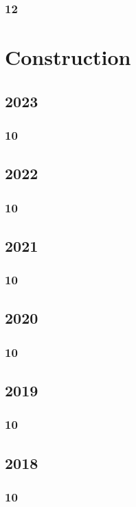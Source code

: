 \documentclass[11pt]{book}
\begin{document}
\subsection{12}





\chapter{Construction}
\section{2023}
\subsection{10}

\section{2022}
\subsection{10}

\section{2021}
\subsection{10}

\section{2020}
\subsection{10}

\section{2019} 
\subsection{10}

\section{2018} 
\subsection{10}


\end{document}
